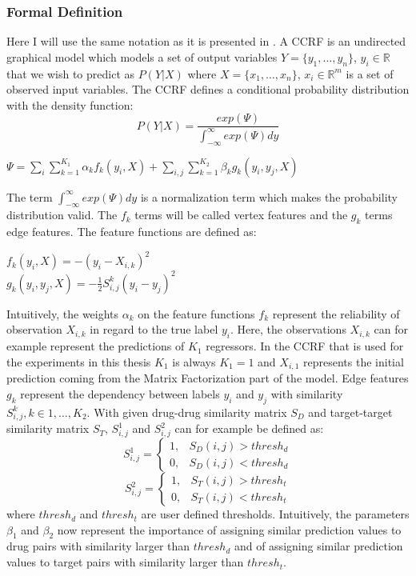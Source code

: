 \subsubsection{Formal Definition}
Here I will use the same notation as it is presented in \cite{baltruvsaitis2013dimensional}. A CCRF is an undirected graphical model which models a set of output variables $Y=\{y_1,\dots,y_n\}$, $y_i \in \mathbb{R}$ that we wish to predict as $P(Y|X)$ where  $X=\{x_1,\dots,x_n\}$, $x_i \in \mathbb{R}^m$ is a set of observed input variables. The CCRF defines a conditional probability distribution with the density function:
\begin{equation}\label{eq:CCRF_main}
P(Y|X)=\frac{exp(\Psi)}{\int_{-\infty}^{\infty} exp(\Psi) dy}
\end{equation}
\begin{center}
$\Psi=\sum_i \sum\limits_{k=1}^{K_1} \alpha_k f_k(y_i, X) + \sum_{i,j} \sum \limits_{k=1}^{K_2} \beta_k g_k (y_i, y_j,X)$
\end{center}
The term $\int_{-\infty}^{\infty} exp(\Psi) dy$ is a normalization term which makes the probability distribution valid. The $f_k$ terms will be called vertex features and the $g_k$ terms edge features. The feature functions are defined as:
\begin{center}
$f_k(y_i,X) = -(y_i - X_{i,k})^2$\\
$g_k(y_i,y_j,X) = -\frac{1}{2}S_{i,j}^k(y_i - y_j)^2$
\end{center}
Intuitively, the weights $\alpha_k$ on the feature functions $f_k$ represent the reliability of observation $X_{i,k}$ in regard to the true label $y_i$. Here, the observations $X_{i,k}$ can for example represent the predictions of $K_1$ regressors. In the CCRF that is used for the experiments in this thesis $K_1$ is always $K_1=1$ and $X_{i,1}$ represents the initial prediction coming from the Matrix Factorization part of the model.  Edge features $g_k$ represent the dependency between labels $y_i$ and $y_j$ with similarity $S_{i,j}^k, k \in 1,\dots, K_2$. With given drug-drug similarity matrix $S_D$ and target-target similarity matrix $S_T$, $S_{i,j}^1$ and $S_{i,j}^2$ can for example be defined as:
\begin{equation}
\label{simi_1}
S_{i,j}^1 =
\begin{cases}
1, & S_D(i,j) > thresh_d \\
0, & S_D(i,j) < thresh_d
\end{cases} 
\end{equation}
\begin{equation}
\label{simi_2}
S_{i,j}^2 =
\begin{cases}
1, & S_T(i,j) > thresh_t \\
0, & S_T(i,j) < thresh_t
\end{cases} 
\end{equation}
where $thresh_d$ and $thresh_t$ are user defined thresholds. Intuitively, the parameters $\beta_1$ and $\beta_2$ now represent the importance of assigning similar prediction values to drug pairs with similarity larger than $thresh_d$ and of assigning similar prediction values to target pairs with similarity larger than $thresh_t$.

